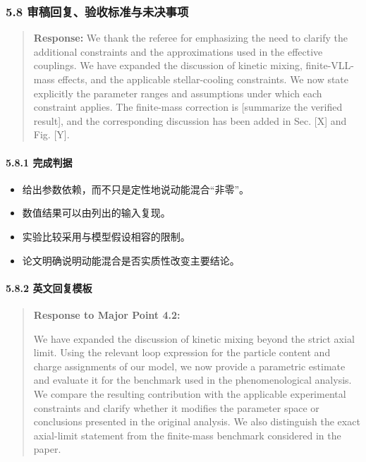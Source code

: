 \documentclass[
  chinese,
  UTF8]{ctexart}
\providecommand{\tightlist}{%
  \setlength{\itemsep}{0pt}\setlength{\parskip}{0pt}}
\begin{document}
\subsubsection{5.8 审稿回复、验收标准与未决事项}\label{major-4-step-8}

\begin{quote}
\textbf{Response:} We thank the referee for emphasizing the need to
clarify the additional constraints and the approximations used in the
effective couplings. We have expanded the discussion of kinetic mixing,
finite-VLL-mass effects, and the applicable stellar-cooling constraints.
We now state explicitly the parameter ranges and assumptions under which
each constraint applies. The finite-mass correction is {[}summarize the
verified result{]}, and the corresponding discussion has been added in
Sec. {[}X{]} and Fig. {[}Y{]}.
\end{quote}

\paragraph{5.8.1 完成判据}\label{ux5b8cux6210ux5224ux636e-1}

\begin{itemize}
\tightlist
\item
  给出参数依赖，而不只是定性地说动能混合``非零''。
\item
  数值结果可以由列出的输入复现。
\item
  实验比较采用与模型假设相容的限制。
\item
  论文明确说明动能混合是否实质性改变主要结论。
\end{itemize}

\paragraph{5.8.2
英文回复模板}\label{ux82f1ux6587ux56deux590dux6a21ux677f-1}

\begin{quote}
\textbf{Response to Major Point 4.2:}

We have expanded the discussion of kinetic mixing beyond the strict
axial limit. Using the relevant loop expression for the particle content
and charge assignments of our model, we now provide a parametric
estimate and evaluate it for the benchmark used in the phenomenological
analysis. We compare the resulting contribution with the applicable
experimental constraints and clarify whether it modifies the parameter
space or conclusions presented in the original analysis. We also
distinguish the exact axial-limit statement from the finite-mass
benchmark considered in the paper.
\end{quote}
\end{document}
